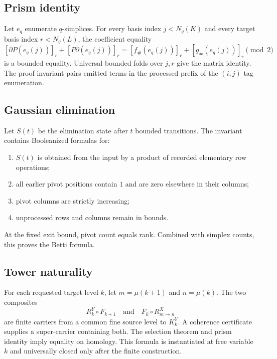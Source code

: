 \subsection{Prism identity}

Let $e_q$ enumerate $q$-simplices.  For every basis index $j<N_q(K)$ and every target basis index $r<N_q(L)$, the coefficient equality
\[
  [\partial P(e_q(j))]_r+[P\partial(e_q(j))]_r
  =[f_\#(e_q(j))]_r+[g_\#(e_q(j))]_r\pmod2
\]
is a bounded equality.  Universal bounded folds over $j,r$ give the matrix identity.  The proof invariant pairs emitted terms in the processed prefix of the $(i,j)$ tag enumeration.

\subsection{Gaussian elimination}

Let $S(t)$ be the elimination state after $t$ bounded transitions.  The invariant contains Booleanized formulas for:
\begin{enumerate}
  \item $S(t)$ is obtained from the input by a product of recorded elementary row operations;
  \item all earlier pivot positions contain $1$ and are zero elsewhere in their columns;
  \item pivot columns are strictly increasing;
  \item unprocessed rows and columns remain in bounds.
\end{enumerate}
At the fixed exit bound, pivot count equals rank.  Combined with simplex counts, this proves the Betti formula.

\subsection{Tower naturality}

For each requested target level $k$, let $m=\mu(k+1)$ and $n=\mu(k)$.  The two composites
\[
  R^Y_k\circ F_{k+1}
  \quad\text{and}\quad
  F_k\circ R^X_{m\to n}
\]
are finite carriers from a common fine source level to $K^Y_k$.  A coherence certificate supplies a super-carrier containing both.  The selection theorem and prism identity imply equality on homology.  This formula is instantiated at free variable $k$ and universally closed only after the finite construction.
